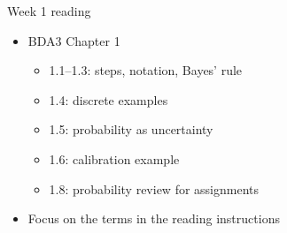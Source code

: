 \documentclass[10pt]{beamer}
\begin{document}
\begin{frame}{Week 1 reading}

  \begin{itemize}
  \item BDA3 Chapter 1
    \begin{itemize}
    \item 1.1--1.3: steps, notation, Bayes' rule
    \item 1.4: discrete examples
    \item 1.5: probability as uncertainty
    \item 1.6: calibration example
    \item 1.8: probability review for assignments
    \end{itemize}
  \item Focus on the terms in the reading instructions
  \end{itemize}
\end{frame}
\end{document}
